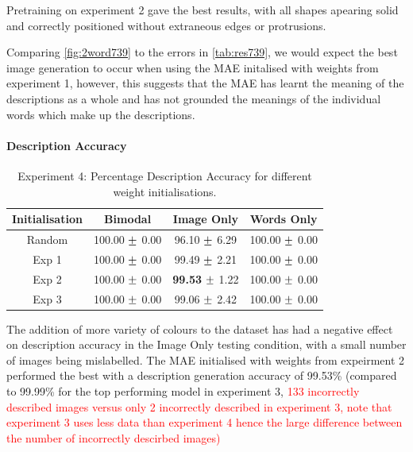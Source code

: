 Pretraining on experiment 2 gave the best results, with all shapes apearing solid and correctly positioned without extraneous edges or protrusions. 

Comparing \autoref{fig:2word739} to the errors in \autoref{tab:res739}, we would expect the best image generation to occur when using the \ac{MAE} initalised with weights from experiment 1, however, this suggests that the \ac{MAE} has learnt the meaning of the descriptions as a whole and has not grounded the meanings of the individual words which make up the descriptions.

\paragraph{Description Accuracy}


\begin{table}[h!]
\centering
	\begin{tabular}{|c|c|c|c|}
	\hline
	\textbf{Initialisation} & 	\textbf{Bimodal} & 	\textbf{Image Only} 	& 	\textbf{Words Only} \\ \hline
Random 	&	100.00	$\mypm$	0.00	&	96.10	$\mypm$	6.29	&	100.00	$\mypm$	0.00	\\ \hline
Exp 1	&	100.00	$\mypm$	0.00	&	99.49	$\mypm$	2.21	&	100.00	$\mypm$	0.00	\\ \hline
Exp 2	&	100.00	$\mypm$	0.00	&	\textbf{99.53}	$\mypm$	1.22	&	100.00	$\mypm$	0.00\\ \hline
Exp 3	&	100.00	$\mypm$	0.00	&	99.06	$\mypm$	2.42	&	100.00	$\mypm$	0.00\\ \hline

	\end{tabular}
\caption{Experiment 4: Percentage Description Accuracy for different weight initialisations.}
\label{tab:res739acc}
\end{table}

The addition of more variety of colours to the dataset has had a negative effect on description accuracy in the Image Only testing condition, with a small number of images being mislabelled. The \ac{MAE} initialised with weights from expeirment 2 performed the best with a description generation accuracy of 99.53\% (compared to 99.99\% for the top performing model in experiment 3, \textcolor{red}{133 incorrectly described images versus only 2 incorrectly described in experiment 3, note that experiment 3 uses less data than experiment 4 hence the large difference between the number of incorrectly descirbed images)}

